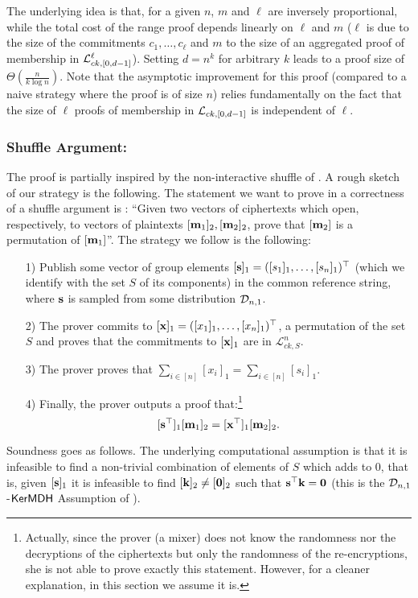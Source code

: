 The underlying idea is that, for a given $n$, $m$ and $\ell$ are inversely proportional, while the total cost of the range proof depends linearly on $\ell$ and $m$ ($\ell$ is due to the size of the commitments $c_1,\ldots,c_\ell$ and $m$ to the size of an aggregated proof of membership in $\mathcal{L}_{ck,[0,d-1]}^\ell$).  Setting $d=n^{k}$ for arbitrary $k$ leads to a proof size of $\Theta(\frac{n}{k \log n})$. 
Note that the asymptotic improvement for this proof (compared to a naive strategy where the proof is of size $n$) relies fundamentally on the fact that the size of $\ell$ proofs of membership in $\mathcal{L}_{ck,[0,d-1]}$ is independent of $\ell$. 
  \subsubsection{Shuffle Argument:} The proof is partially inspired by the non-interactive shuffle of \cite{AC:GroLu07}. A rough sketch of our strategy is the following. The statement we want to prove in a correctness of a shuffle argument is : ``Given two vectors of ciphertexts which open, respectively, to vectors of plaintexts $[\mathbf{m}_1]_2, [\mathbf{m}_2]_2$, prove that 
 $[\mathbf{m}_2]$ is a permutation of $[\mathbf{m}_1]$''. 
The strategy we follow is the following:  
\begin{itemize}
\item[1)] Publish some vector of group elements $[\mathbf{s}]_1 =([s_1]_1,\ldots,[s_n]_1)^\top$ (which we identify with the set $S$ of its components) in the common reference string, where $\mathbf{s}$ is sampled from some distribution $\mathcal{D}_{n,1}$.
\item[2)] The prover commits to $[\mathbf{x}]_1=([x_1]_1,\ldots,[x_n]_1)^\top$, a permutation of the set $S$ and proves that the commitments to $[\mathbf{x}]_1$ are in $\mathcal{L}^{n}_{ck,S}$.
\item[3)] The prover proves that $\sum_{i \in [n]} [x_i]_1 =\sum_{i \in [n]} [s_i]_1$.
\item[4)] Finally, the prover outputs a proof that:\footnote{Actually, since the prover (a mixer) does not know the randomness nor the decryptions of the ciphertexts but only the randomness of the re-encryptions, she is not able to prove exactly this statement. However, for a cleaner explanation, in this section we assume it is.} 
\begin{equation}\label{shuffle:ker}[\mathbf{s}^{\top}]_1 [\mathbf{m}_1]_2 =[\mathbf{x}^{\top}]_1 [\mathbf{m}_2]_2.
\end{equation}
\end{itemize}
Soundness goes as follows. The underlying computational assumption is that it is infeasible to find a non-trivial combination of elements of $S$ which adds to $0$, that is, given $[\mathbf{s}]_1$ it is infeasible to find $[\mathbf{k}]_2 \neq [\mathbf{0}]_2$ such that
$\mathbf{s}^{\top} \mathbf{k}=\mathbf{0}$ (this is the $\mathcal{D}_{n,1}$-$\mathsf{KerMDH}$ Assumption of \cite{EPRINT:MorRafVil15}). 
 
